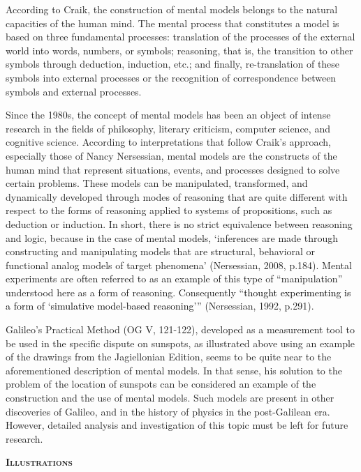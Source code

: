 \begin{artengenv}
According to Craik, the construction of mental models belongs to the natural capacities of the human mind. The mental
process that constitutes a model is based on three fundamental processes: translation of the processes of the external
world into words, numbers, or symbols; reasoning, that is, the transition to other symbols through deduction,
induction, etc.; and finally, re-translation of these symbols into external processes or the recognition of
correspondence between symbols and external processes.

Since the 1980s, the concept of mental models has been an object of intense research in the fields of philosophy,
literary criticism, computer science, and cognitive science. According to interpretations that follow Craik’s approach,
especially those of Nancy Nersessian, mental models are the constructs of the human mind that represent situations,
events, and processes designed to solve certain problems. These models can be manipulated, transformed, and dynamically
developed through modes of reasoning that are quite different with respect to the forms of reasoning applied to systems
of propositions, such as deduction or induction. In short, there is no strict equivalence between reasoning and logic,
because in the case of mental models, ‘inferences are made through constructing and manipulating models that are
structural, behavioral or functional analog models of target phenomena’ \label{ref:RNDTNzkt8wP4B}(Nersessian, 2008,
p.184). Mental experiments are often referred to as an example of this type of “manipulation” understood here as a form
of reasoning. Consequently “\textcolor{black}{thought experimenting is a form of ‘simulative model-based reasoning’”}
\label{ref:RNDuzOiOvTu5n}(Nersessian, 1992, p.291). 

Galileo’s Practical Method (OG V, 121-122), developed as a measurement tool to be used in the specific dispute on
sunspots, as illustrated above using an example of the drawings from the Jagiellonian Edition, seems to be quite near
to the aforementioned description of mental models. In that sense, his solution to the problem of the location of
sunspots can be considered an example of the construction and the use of mental models. Such models are present in
other discoveries of Galileo, and in the history of physics in the post-Galilean era. However, detailed analysis and
investigation of this topic must be left for future research. 

{\centering\bfseries\scshape
Illustrations
\par}


\end{artengenv}
